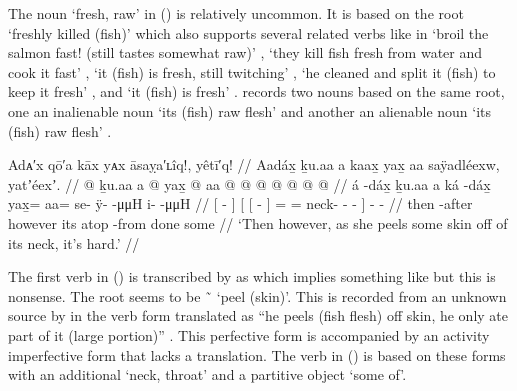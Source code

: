 The noun  ‘fresh, raw’ in (\lastx) is relatively uncommon.
It is based on the root  ‘freshly killed (fish)’ which also supports several related verbs like in  ‘broil the salmon fast! (still tastes somewhat raw)’ \parencite[37.341]{story-naish:1973},  ‘they kill fish fresh from water and cook it fast’ \parencite[56.628]{story-naish:1973},  ‘it (fish) is fresh, still twitching’ \parencite[97.1235]{story-naish:1973},  ‘he cleaned and split it (fish) to keep it fresh’ \parencite[07/23]{leer:1973}, and  ‘it (fish) is fresh’ \parencite[07/24]{leer:1973}.
\citeauthor{leer:1973} records two nouns based on the same root, one an inalienable noun  ‘its (fish) raw flesh’ and another an alienable noun  ‘its (fish) raw flesh’ \parencite[07/24]{leer:1973}.

\ex\label{ex:100-130-as-she-cuts}%
%
\begingl
	\glpreamble	Adᴀ′x qō′a kāx yᴀx āsaỵa′ʟîq!, yêtī′q! //
	\glpreamble	Aadáx̱ ḵu.aa a kaax̱ yax̱ aa saÿadléexw, yatʼéexʼ. //
	\gla	{}  @ {} {} ḵu.aa
		{} {} a  @ {} {}
			yax̱ @ aa @  @ {} @ {} @ {} @ {} {}
		 @ {} @ {} //
	\glb	{} á -dáx̱ {} ḵu.aa
		{} {} a ká -dáx̱ {}
			yax̱= aa= se- ÿ-  -μμH {} {}
		i-  -μμH //
	\glc	{}[  - {}] 
		{}[ {}[   - {}]
			= = neck- -  - \· {}]
		-  - //
	\gld	{} then -after {} however
		{} {} its atop -from {}
			done some  {} {} {} {} {}
		 {} {} //
	\glft	‘Then however, as she peels some skin off of its neck, it’s hard.’
		//
\endgl
\xe

The first verb in (\lastx) is transcribed by \citeauthor{swanton:1909} as  which implies something like  but this is nonsense.
The root seems to be  \~\  ‘peel (skin)’.
This is recorded from an unknown source by \citeauthor{leer:1973} in the verb form  translated as “he peels (fish flesh) off skin, he only ate part of it (large portion)” \parencite[08/113]{leer:1973}.
This perfective form is accompanied by an activity imperfective form  that lacks a translation.
The verb  in (\lastx) is based on these forms with an additional  ‘neck, throat’ and a partitive object  ‘some of’.

